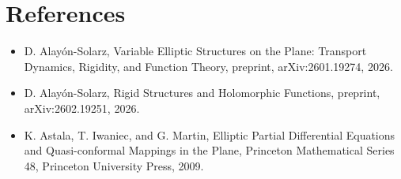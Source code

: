 \documentclass[11pt,a4paper]{article}
\begin{document}
\section{References}
\begin{itemize}
    \item D. Alayón-Solarz, Variable Elliptic Structures on the Plane: Transport Dynamics, Rigidity, and Function Theory, preprint, arXiv:2601.19274, 2026.
    \item D. Alayón-Solarz, Rigid Structures and Holomorphic Functions, preprint, arXiv:2602.19251, 2026.
    \item K. Astala, T. Iwaniec, and G. Martin, Elliptic Partial Differential Equations and Quasi-conformal Mappings in the Plane, Princeton Mathematical Series 48, Princeton University Press, 2009.
\end{itemize}
\end{document}

